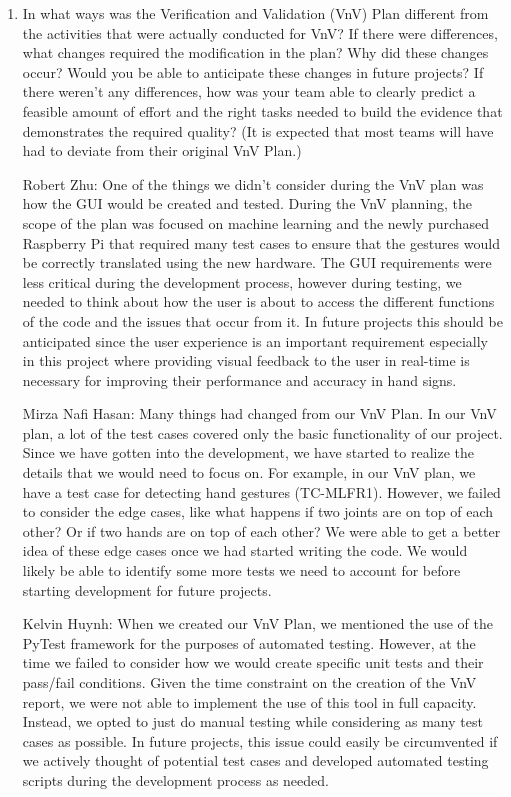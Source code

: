 \documentclass[12pt, titlepage]{article}
\begin{document}
\begin{enumerate}
  \item In what ways was the Verification and Validation (VnV) Plan different
  from the activities that were actually conducted for VnV?  If there were
  differences, what changes required the modification in the plan?  Why did
  these changes occur?  Would you be able to anticipate these changes in future
  projects?  If there weren't any differences, how was your team able to clearly
  predict a feasible amount of effort and the right tasks needed to build the
  evidence that demonstrates the required quality?  (It is expected that most
  teams will have had to deviate from their original VnV Plan.)

  Robert Zhu: One of the things we didn’t consider during the VnV plan was how the 
  GUI would be created and tested. During the VnV planning, the scope of the plan was 
  focused on machine learning and the newly purchased Raspberry Pi that required many 
  test cases to ensure that the gestures would be correctly translated using the new 
  hardware. The GUI requirements were less critical during the development process, 
  however during testing, we needed to think about how the user is about to access 
  the different functions of the code and the issues that occur from it. In future 
  projects this should be anticipated since the user experience is an important 
  requirement especially in this project where providing visual feedback to the user 
  in real-time is necessary for improving their performance and accuracy in hand signs.
  
  Mirza Nafi Hasan: Many things had changed from our VnV Plan. In our VnV plan, a lot 
  of the test cases covered only the basic functionality of our project. Since we have 
  gotten into the development, we have started to realize the details that we would need 
  to focus on. For example, in our VnV plan, we have a test case for detecting hand 
  gestures (TC-MLFR1). However, we failed to consider the edge cases, like what happens
  if two joints are on top of each other? Or if two hands are on top of each other? We 
  were able to get a better idea of these edge cases once we had started writing the 
  code. We would likely be able to identify some more tests we need to account for 
  before starting development for future projects.

  Kelvin Huynh: When we created our VnV Plan, we mentioned the use of the PyTest framework for 
  the purposes of automated testing. However, at the time we failed to consider how we would create 
  specific unit tests and their pass/fail conditions. Given the time constraint on the creation of the 
  VnV report, we were not able to implement the use of this tool in full capacity. Instead, we opted to 
  just do manual testing while considering as many test cases as possible. In future projects, this issue 
  could easily be circumvented if we actively thought of potential test cases and developed automated testing 
  scripts during the development process as needed.

\end{enumerate}
\end{document}
